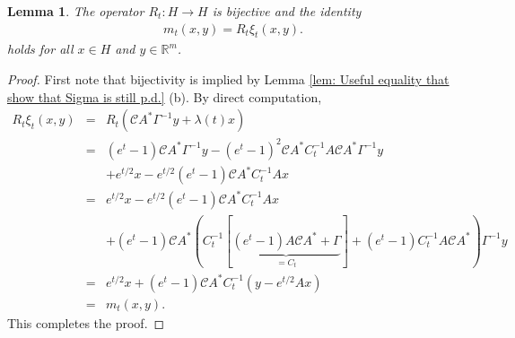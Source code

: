\documentclass[10pt]{article} %
\newcommand{\R}{\mathbb{R}}
\theoremstyle{plain}
\newtheorem{lemma}[theorem]{Lemma}
\theoremstyle{definition}
\theoremstyle{remark}
\newcommand{\C}{\mathcal C}
\begin{document}
\begin{lemma}\label{lem: writing m_t for no forward}
The operator $R_t : H\to H$ is bijective and the identity
\begin{eqnarray*}
    m_t(x,y) = R_t \xi_t(x, y).
\end{eqnarray*}
holds for all $x\in H$ and $y\in \R^m$.
\end{lemma}
\begin{proof}
    First note that bijectivity is implied by Lemma \ref{lem: Useful equality that show that Sigma is still p.d.} (b).
    By direct computation,
    \begin{eqnarray*}
        R_t \xi_t(x, y)&= & R_t \left(\C A^* \Gamma^{-1}y + \lambda(t) x\right) \\ 
        & = & (e^t-1) \C A^* \Gamma^{-1}y - (e^t-1)^2  \C A^* C_t^{-1} A \C A^* \Gamma^{-1}y \\
        & & + e^{t/2} x - e^{t/2}(e^t-1)\C A^* C_t^{-1}Ax \\
        & = & e^{t/2}x - e^{t/2}(e^t-1)\C A^* C_t^{-1}Ax \\
        & & + (e^t-1) \C A^* (C_t^{-1} [ \underbrace{(e^t-1) A \C A^*+ \Gamma}_{= C_t} ] + (e^t-1)C_t^{-1} A \C A^* ) \Gamma^{-1}y \\
        & = & e^{t/2}x + (e^t-1) \C A^* C_t^{-1} \left( y- e^{t/2}Ax\right) \\
        & = & m_t(x, y).
    \end{eqnarray*}
    This completes the proof.
\end{proof}
\end{document}
